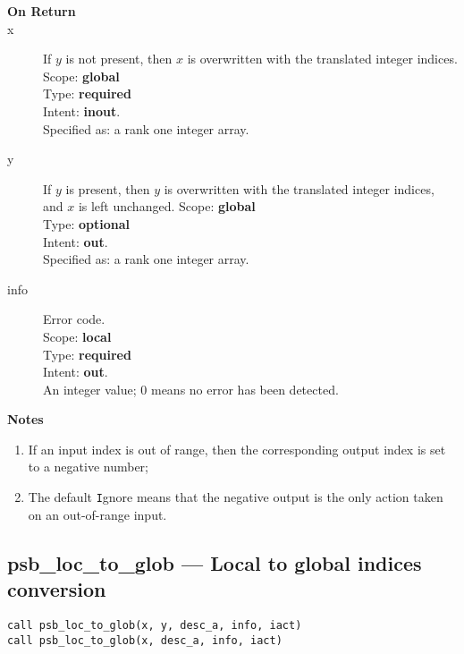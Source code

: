 \begin{description}
\item[\bf On Return]
\item[x] If $y$ is not present,
  then $x$ is overwritten with the translated integer indices. 
Scope: {\bf global} \\
Type: {\bf required}\\
Intent: {\bf inout}.\\
Specified as: a rank one integer array.
\item[y] If $y$ is  present,
  then $y$ is overwritten with the translated integer indices, and $x$
  is left unchanged. 
Scope: {\bf global} \\
Type: {\bf optional}\\
Intent: {\bf out}.\\
Specified as: a rank one integer array.
\item[info] Error code.\\
Scope: {\bf local} \\
Type: {\bf required} \\
Intent: {\bf out}.\\
An integer value; 0 means no error has been detected. 
\end{description}

{\par\noindent\large\bfseries Notes}
\begin{enumerate}
\item If an input index is out of range, then the corresponding output
  index is set to a negative number;
\item The default \verb|I|gnore means that the negative output is the
  only action taken on an out-of-range input.
\end{enumerate}


\clearpage\subsection{psb\_loc\_to\_glob --- Local to global indices
  conversion}

\begin{verbatim}
call psb_loc_to_glob(x, y, desc_a, info, iact)
call psb_loc_to_glob(x, desc_a, info, iact)
\end{verbatim}

